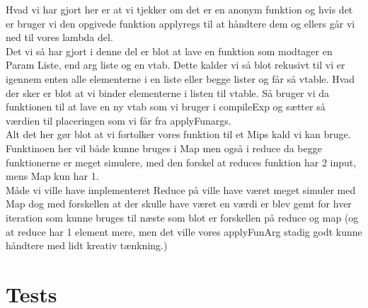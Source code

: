 \documentclass[a4paper]{article}
\begin{document}
Hvad vi har gjort her er at vi tjekker om det er en anonym funktion og hvis det er bruger vi den opgivede funktion applyregs til at håndtere dem og ellers går vi ned til vores lambda del.\\
Det vi så har gjort i denne del er blot at lave en funktion som modtager en Param Liste, end arg liste og en vtab. Dette kalder vi så blot rekusivt til vi er igennem enten alle elementerne i en liste eller begge lister og får så vtable. Hvad der sker er blot at vi binder elementerne i listen til vtable. Så bruger vi da funktionen til at lave en ny vtab som vi bruger i compileExp og sætter så værdien til placeringen som vi får fra applyFunargs.\\
Alt det her gør blot at vi fortolker vores funktion til et Mips kald vi kan bruge.\\
Funktinoen her vil både kunne bruges i Map men også i reduce da begge funktionerne er meget simulere, med den forskel at reduces funktion har 2 input, mens Map kun har 1.\\[0.1in]
Måde vi ville have implementeret Reduce på ville have været meget simuler med Map dog med forskellen at der skulle have været en værdi er blev gemt for hver iteration som kunne bruges til næste som blot er forskellen på reduce og map (og at reduce har 1 element mere, men det ville vores applyFunArg stadig godt kunne håndtere med lidt kreativ tænkning.)
\section{Tests}
\end{document}
